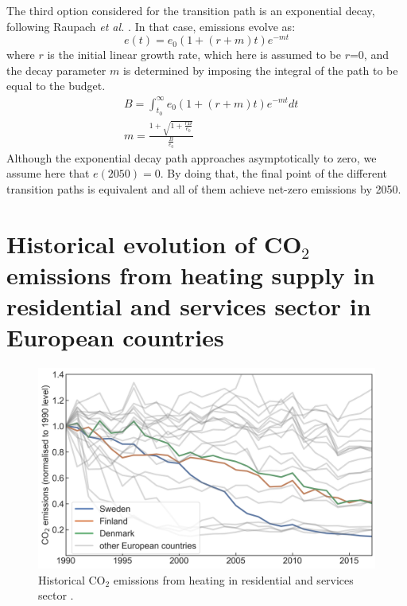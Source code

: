 \documentclass[3p]{elsarticle} %
\begin{document}
The third option considered for the transition path is an exponential decay, following Raupach \textit{et al. }\cite{Raupach_2014}. In that case, emissions evolve as:
\begin{equation}
e(t) = e_0(1+(r+m)t)e^{-mt}
\end{equation}
where $r$ is the initial linear growth rate, which here is assumed to be $r$=0, and the decay parameter $m$ is determined by imposing the integral of the path to be equal to the budget.
\begin{equation}
\begin{aligned}
& B=\int_{t_0}^{\infty} e_0(1+(r+m)t)e^{-mt} dt \\
& m=\frac{1+ \sqrt{1+\frac{rB}{e_0}}}{\frac{B}{e_0}}
\end{aligned}
\end{equation}
Although the exponential decay path approaches asymptotically to zero, we assume here that $e(2050)=0$. By doing that, the final point of the different transition paths is equivalent and all of them achieve net-zero emissions by 2050.

\FloatBarrier

\newpage

\section{Historical evolution of CO$_2$ emissions from heating supply in residential and services sector in European countries}

\begin{figure}[!h]
\centering
\includegraphics[width=12cm]{figures/emissions_heating.png}
\caption{Historical CO$_2$ emissions from heating in residential and services sector \cite{UNFCCC_inventory}. } \label{fig_emissions_heating} 
\end{figure}
\end{document}
